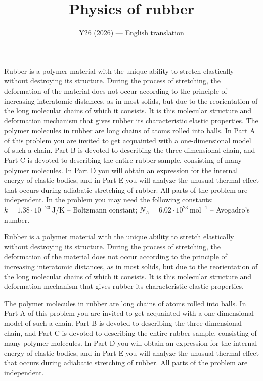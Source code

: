 \documentclass[11pt,a4paper]{article}
\title{\textbf{Physics of rubber}}
\author{\normalsize Y26 (2026) --- English translation}
\date{}
\begin{document}
\maketitle

Rubber is a polymer material with the unique ability to stretch elastically without destroying its structure. During the process of stretching, the deformation of the material does not occur according to the principle of increasing interatomic distances, as in most solids, but due to the reorientation of the long molecular chains of which it consists. It is this molecular structure and deformation mechanism that gives rubber its characteristic elastic properties. The polymer molecules in rubber are long chains of atoms rolled into balls. In Part A of this problem you are invited to get acquainted with a one-dimensional model of such a chain. Part B is devoted to describing the three-dimensional chain, and Part C is devoted to describing the entire rubber sample, consisting of many polymer molecules. In Part D you will obtain an expression for the internal energy of elastic bodies, and in Part E you will analyze the unusual thermal effect that occurs during adiabatic stretching of rubber. All parts of the problem are independent. In the problem you may need the following constants: $k = 1.38\cdot10^{-23}~\text{J}/\text{K}$ – Boltzmann constant; $N_A = 6.02\cdot 10^{23}~\text{mol}^{-1}$ – Avogadro’s number.

Rubber is a polymer material with the unique ability to stretch elastically without destroying its structure. During the process of stretching, the deformation of the material does not occur according to the principle of increasing interatomic distances, as in most solids, but due to the reorientation of the long molecular chains of which it consists. It is this molecular structure and deformation mechanism that gives rubber its characteristic elastic properties.

The polymer molecules in rubber are long chains of atoms rolled into balls. In Part A of this problem you are invited to get acquainted with a one-dimensional model of such a chain. Part B is devoted to describing the three-dimensional chain, and Part C is devoted to describing the entire rubber sample, consisting of many polymer molecules. In Part D you will obtain an expression for the internal energy of elastic bodies, and in Part E you will analyze the unusual thermal effect that occurs during adiabatic stretching of rubber. All parts of the problem are independent.
\end{document}
